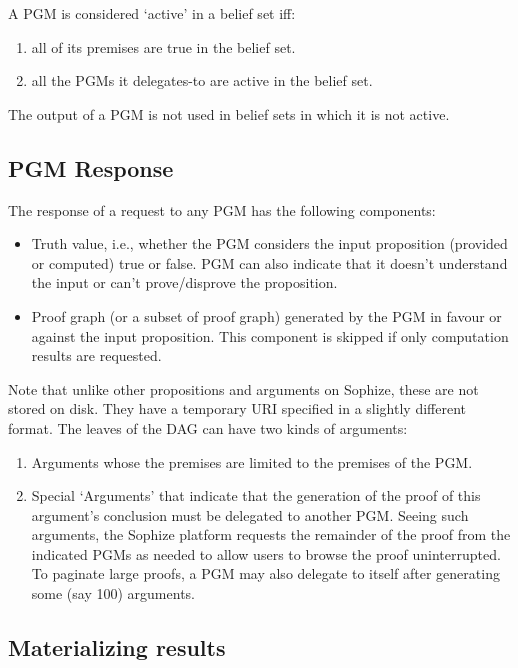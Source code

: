 \documentclass[runningheads]{llncs}
\begin{document}
A PGM is considered `active' in a belief set iff:
\begin{enumerate}
\item all of its premises are true in the belief set.
\item all the PGMs it delegates-to are active in the belief set.
\end{enumerate}

The output of a PGM is not used in belief sets in which it is not active.

\subsection{PGM Response}
The response of a request to any PGM has the following components:

\begin{itemize}

\item Truth value, i.e., whether the PGM considers the input proposition (provided or computed) true or false. PGM can also indicate that it doesn't understand the input or can't prove/disprove the proposition.

\item Proof graph (or a subset of proof graph) generated by the PGM in favour or against the input proposition. This component is skipped if only computation results are requested.
\end{itemize}

Note that unlike other propositions and arguments on Sophize, these are not stored on disk. They have a temporary URI specified in a slightly different format. The leaves of the DAG can have two kinds of arguments:

\begin{enumerate}
\item Arguments whose the premises are limited to the premises of the PGM.
\item Special `Arguments' that indicate that the generation of the proof of this argument's conclusion must be delegated to another PGM. Seeing such arguments, the Sophize platform requests the remainder of the proof from the indicated PGMs as needed to allow users to browse the proof uninterrupted. To paginate large proofs, a PGM may also delegate to itself after generating some (say 100) arguments.
\end{enumerate}

\subsection{Materializing results}
\end{document}
